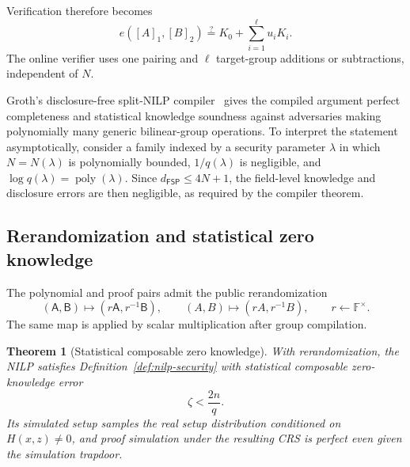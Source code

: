 \documentclass[11pt]{article}
\newtheorem{theorem}{Theorem}[section]
\theoremstyle{definition}
\newcommand{\F}{\mathbb F}
\newcommand{\FSP}{\mathsf{FSP}}
\begin{document}
Verification therefore becomes
\begin{equation}
  e([A]_1,[B]_2)
  \stackrel{?}{=}
  K_0+\sum_{i=1}^{\ell}u_iK_i.
  \label{eq:short-pairing-verifier}
\end{equation}
The online verifier uses one pairing and $\ell$ target-group
additions or subtractions, independent of $N$.

Groth's disclosure-free split-NILP compiler~\cite[Section~2.5]{Groth16} gives
the compiled argument perfect completeness and
statistical knowledge soundness against adversaries making polynomially many
generic bilinear-group operations.  To interpret the statement
asymptotically, consider a family indexed by a security parameter $\lambda$ in
which $N=N(\lambda)$ is polynomially bounded, $1/q(\lambda)$ is negligible,
and $\log q(\lambda)=\operatorname{poly}(\lambda)$.  Since
$d_{\FSP}\le4N+1$, the field-level knowledge and disclosure errors are then
negligible, as required by the compiler theorem.

\subsection{Rerandomization and statistical zero knowledge}
\label{sec:zk}

The polynomial and proof pairs admit the public rerandomization
\begin{equation}
  (\mathsf A,\mathsf B)\longmapsto(r\mathsf A,r^{-1}\mathsf B),
  \qquad
  (A,B)\longmapsto(rA,r^{-1}B),
  \qquad r\leftarrow\F^\times.
  \label{eq:public-rerandomization}
\end{equation}
The same map is applied by scalar multiplication after group compilation.

\begin{theorem}[Statistical composable zero knowledge]
\label{thm:statistical-zk}
With rerandomization, the NILP satisfies Definition~\ref{def:nilp-security}
with statistical composable zero-knowledge error
\[
  \zeta<\frac{2n}{q}.
\]
Its simulated setup samples the real setup distribution conditioned on
$H(x,z)\ne0$, and proof simulation under the resulting CRS is perfect even
given the simulation trapdoor.
\end{theorem}
\end{document}
